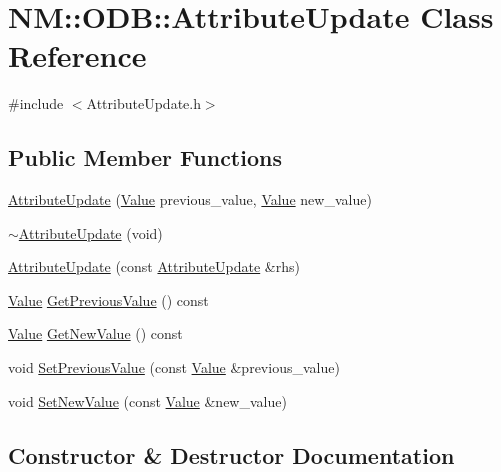 \hypertarget{class_n_m_1_1_o_d_b_1_1_attribute_update}{}\section{N\+M\+:\+:O\+D\+B\+:\+:Attribute\+Update Class Reference}
\label{class_n_m_1_1_o_d_b_1_1_attribute_update}


{\ttfamily \#include $<$Attribute\+Update.\+h$>$}

\subsection*{Public Member Functions}
\begin{DoxyCompactItemize}
\item 
\hyperlink{class_n_m_1_1_o_d_b_1_1_attribute_update_aca2374599103637091805a86cd781df3}{Attribute\+Update} (\hyperlink{class_n_m_1_1_o_d_b_1_1_value}{Value} previous\+\_\+value, \hyperlink{class_n_m_1_1_o_d_b_1_1_value}{Value} new\+\_\+value)
\item 
\hyperlink{class_n_m_1_1_o_d_b_1_1_attribute_update_afc4304eac673574362bf86cb835e8810}{$\sim$\+Attribute\+Update} (void)
\item 
\hyperlink{class_n_m_1_1_o_d_b_1_1_attribute_update_aae1648e3da9b6e9511be605432cf953b}{Attribute\+Update} (const \hyperlink{class_n_m_1_1_o_d_b_1_1_attribute_update}{Attribute\+Update} \&rhs)
\item 
\hyperlink{class_n_m_1_1_o_d_b_1_1_value}{Value} \hyperlink{class_n_m_1_1_o_d_b_1_1_attribute_update_aa8aa2f8c4893bb16c3d5507c8dfb68fd}{Get\+Previous\+Value} () const 
\item 
\hyperlink{class_n_m_1_1_o_d_b_1_1_value}{Value} \hyperlink{class_n_m_1_1_o_d_b_1_1_attribute_update_af82771e71545ececb287fe3c231e5ae5}{Get\+New\+Value} () const 
\item 
void \hyperlink{class_n_m_1_1_o_d_b_1_1_attribute_update_ad706e605908c8f8340056b4ac7106581}{Set\+Previous\+Value} (const \hyperlink{class_n_m_1_1_o_d_b_1_1_value}{Value} \&previous\+\_\+value)
\item 
void \hyperlink{class_n_m_1_1_o_d_b_1_1_attribute_update_abfb2f98237b6d6bea47ec24fde81e4a3}{Set\+New\+Value} (const \hyperlink{class_n_m_1_1_o_d_b_1_1_value}{Value} \&new\+\_\+value)
\end{DoxyCompactItemize}


\subsection{Constructor \& Destructor Documentation}
\hypertarget{class_n_m_1_1_o_d_b_1_1_attribute_update_aca2374599103637091805a86cd781df3}{}
